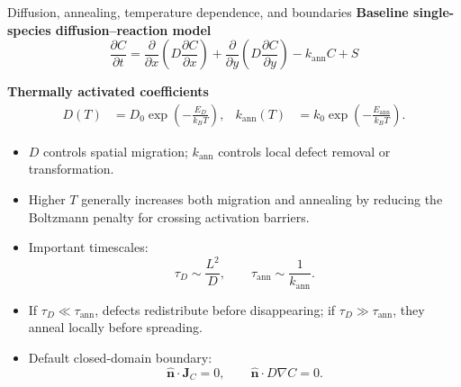 \documentclass[aspectratio=169,10pt]{beamer}
\newcommand{\Jvec}{\mathbf{J}}
\begin{document}
\begin{frame}{Diffusion, annealing, temperature dependence, and boundaries}
\small
\textbf{Baseline single-species diffusion--reaction model}
\vspace{-0.25em}
\begin{equation*}
\boxed{
\frac{\partial C}{\partial t}
=
\frac{\partial}{\partial x}\!\left(D\frac{\partial C}{\partial x}\right)
+
\frac{\partial}{\partial y}\!\left(D\frac{\partial C}{\partial y}\right)
-k_{\mathrm{ann}}C+S
}
\end{equation*}

\vspace{0.05em}
\textbf{Thermally activated coefficients}
\vspace{-0.25em}
\begin{align*}
D(T)&=D_0\exp\!\left(-\frac{E_D}{k_BT}\right),&
 k_{\mathrm{ann}}(T)&=k_0\exp\!\left(-\frac{E_{\mathrm{ann}}}{k_BT}\right).
\end{align*}

\vspace{-0.15em}
\begin{itemize}
    \item $D$ controls spatial migration; $k_{\mathrm{ann}}$ controls local defect removal or transformation.
    \item Higher $T$ generally increases both migration and annealing by reducing the Boltzmann penalty for crossing activation barriers.
    \item Important timescales:
    \[
        \tau_D\sim\frac{L^2}{D},
        \qquad
        \tau_{\mathrm{ann}}\sim\frac{1}{k_{\mathrm{ann}}}.
    \]
    \item If $\tau_D\ll\tau_{\mathrm{ann}}$, defects redistribute before disappearing; if $\tau_D\gg\tau_{\mathrm{ann}}$, they anneal locally before spreading.
    \item Default closed-domain boundary:
    \[
        \hat{\mathbf n}\cdot\Jvec_C=0,
        \qquad
        \hat{\mathbf n}\cdot D\nabla C=0.
    \]
\end{itemize}
\end{frame}
\end{document}
